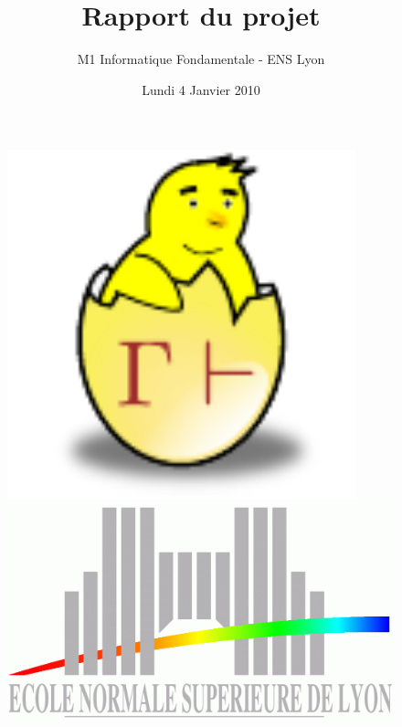 \documentclass[slidetop]{beamer}
\date{Lundi 4 Janvier 2010}
\title{Rapport du projet \coquille}
\author{M1 Informatique Fondamentale - ENS Lyon}
\begin{document}
\begin{frame}[plain]
    \maketitle

    \begin{figure}[ht]
        \begin{minipage}[b]{0.4\linewidth}
            \centering
            \includegraphics[width=0.9\textwidth]{../images/common/poussin.pdf}
        \end{minipage}
        \hfill
        \begin{minipage}[b]{0.4\linewidth}   
            \centering
            \includegraphics[scale=0.1]{../images/common/ens.jpg}
        \end{minipage}
    \end{figure}
\end{frame}
\end{document}

